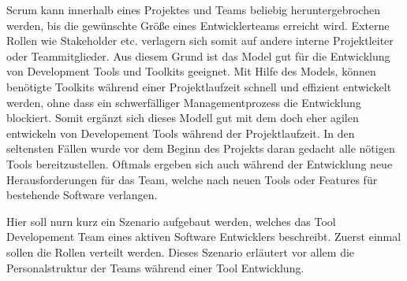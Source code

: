 \documentclass[pagesize, paper=a4, fontsize=12pt, titlepage=true, headings=small, headnosepline, abstractoff, liststotoc, nochapterprefix, plainheadsepline, twoside]{scrreprt}
\begin{document}
Scrum kann innerhalb eines Projektes und Teams beliebig heruntergebrochen werden, bis die gewünschte Größe eines Entwicklerteams erreicht wird. Externe Rollen wie Stakeholder etc. verlagern sich somit auf andere interne Projektleiter oder Teammitglieder. Aus diesem Grund ist das Model gut für die Entwicklung von Development Tools und Toolkits geeignet. Mit Hilfe des Models, können benötigte Toolkits während einer Projektlaufzeit schnell und effizient entwickelt werden, ohne dass ein schwerfälliger Managementprozess die Entwicklung blockiert. Somit ergänzt sich dieses Modell gut mit dem doch eher agilen entwickeln von Developement Tools während der Projektlaufzeit. In den seltensten Fällen wurde vor dem Beginn des Projekts daran gedacht alle nötigen Tools bereitzustellen. Oftmals ergeben sich auch während der Entwicklung neue Herausforderungen für das Team, welche nach neuen Tools oder Features für bestehende Software verlangen.

Hier soll nurn kurz ein Szenario aufgebaut werden, welches das Tool Developement Team eines aktiven Software Entwicklers beschreibt. Zuerst einmal sollen die Rollen verteilt werden. Dieses Szenario erläutert vor allem die Personalstruktur der Teams während einer Tool Entwicklung.
\end{document}
